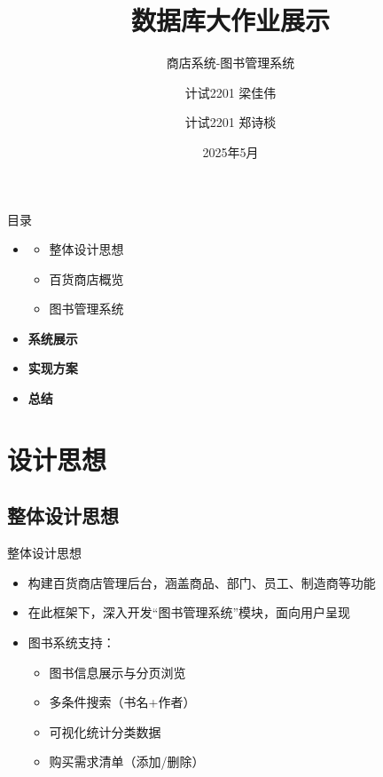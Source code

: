 \documentclass{ctexbeamer}
\title{数据库大作业展示}
\subtitle{商店系统-图书管理系统}
\author{计试2201 梁佳伟 \and 计试2201 郑诗棪}
\institute[西安交大]{西安交通大学}
\date{2025年5月}
\begin{document}
\begin{frame}
  \titlepage
\end{frame}

\begin{frame}{目录}
  \begin{itemize}
    \item {}
    \begin{itemize}
      \item 整体设计思想
      \item 百货商店概览
      \item 图书管理系统
    \end{itemize}
    \item \textbf{系统展示}
    \item \textbf{实现方案}
    \item \textbf{总结}
  \end{itemize}
\end{frame}

\section{设计思想}

\subsection{整体设计思想}
\begin{frame}{整体设计思想}
  \begin{itemize}
    \item 构建百货商店管理后台，涵盖商品、部门、员工、制造商等功能
    \item 在此框架下，深入开发“图书管理系统”模块，面向用户呈现
    \item 图书系统支持：
      \begin{itemize}
        \item 图书信息展示与分页浏览
        \item 多条件搜索（书名+作者）
        \item 可视化统计分类数据
        \item 购买需求清单（添加/删除）
      \end{itemize}
  \end{itemize}
\end{frame}
\end{document}

